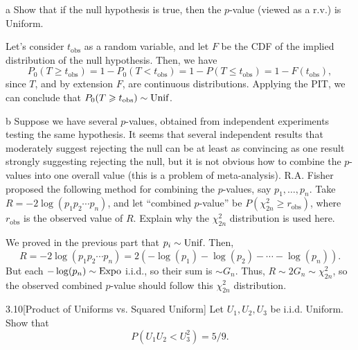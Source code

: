 \documentclass{pset}
\begin{document}
\begin{parts}
  \begin{part}{a}
    Show that if the null hypothesis is true, then the $p$-value (viewed as a r.v.) is Uniform.
  \end{part}
    Let's consider $t_{\textrm{obs}}$ as a random variable, and let $F$ be the CDF of the implied distribution of the null hypothesis. Then, we have
    \[
      P_0(T \geq t_{\textrm{obs}}) = 1-P_0(T < t_{\textrm{obs}}) = 1-P(T \leq t_{\textrm{obs}}) = 1 - F(t_{\textrm{obs}}),
    \]
    since $T$, and by extension $F$, are continuous distributions. Applying the PIT, we can conclude that $P_0(T\geqslant t_{\textrm{obs}})\sim \textrm{Unif}$.

  \begin{part}{b}
    Suppose we have several $p$-values, obtained from independent experiments testing the same hypothesis. It seems that several independent results that moderately suggest rejecting the null can be at least as convincing as one result strongly suggesting rejecting the null, but it is not obvious how
    to combine the $p$-values into one overall value (this is a problem of meta-analysis). R.A. Fisher proposed the following method for combining the $p$-values, say $p_1,\ldots, p_n$. Take $R=-2\log(p_1p_2\cdots p_n)$, and let ``combined $p$-value'' be $P(\chi_{2n}^2 \geq r_{\textrm{obs}})$, where $r_{\textrm{obs}}$ is the observed value of $R$. Explain why the $\chi_{2n}^2$ distribution is used here.
  \end{part}

  We proved in the previous part that $p_i\sim \textrm{Unif}$. Then,
  \[R = -2\log(p_1p_2\cdots p_n) = 2(-\log(p_1)-\log(p_2)-\cdots -\log(p_n)).\]
  But each $-\log(p_n)\sim \textrm{Expo}$ i.i.d., so their sum is $\sim G_n$. Thus, $R\sim 2 G_n\sim \chi^2_{2n}$, so the observed combined $p$-value should follow this $\chi^2_{2n}$ distribution.
\end{parts}

\begin{problem}{3.10}[Product of Uniforms vs. Squared Uniform]
  Let $U_1, U_2, U_3$ be i.i.d. Uniform. Show that
  \[P(U_1 U_2 < U_3^2) = 5/9.\]
\end{problem}
\end{document}
